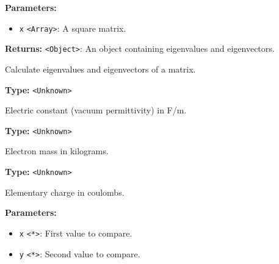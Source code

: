 \documentclass[12pt,a4paper]{article}
\begin{document}
\vspace{5mm}
\noindent {}


\noindent \textbf{Parameters:}
\begin{itemize}
  \item \texttt{x} \texttt{<Array>}: A square matrix.
\end{itemize}

\noindent \textbf{Returns:} \texttt{<Object>}: An object containing eigenvalues and eigenvectors.

\noindent Calculate eigenvalues and eigenvectors of a matrix.

\vspace{5mm}
\noindent {}\vspace{4mm}


\noindent \textbf{Type:} \texttt{<Unknown>}

\noindent Electric constant (vacuum permittivity) in F/m.

\vspace{5mm}
\noindent {}\vspace{4mm}


\noindent \textbf{Type:} \texttt{<Unknown>}

\noindent Electron mass in kilograms.

\vspace{5mm}
\noindent {}\vspace{4mm}


\noindent \textbf{Type:} \texttt{<Unknown>}

\noindent Elementary charge in coulombs.

\vspace{5mm}
\noindent {}


\noindent \textbf{Parameters:}
\begin{itemize}
  \item \texttt{x} \texttt{<*>}: First value to compare.
  \item \texttt{y} \texttt{<*>}: Second value to compare.
\end{itemize}
\end{document}
